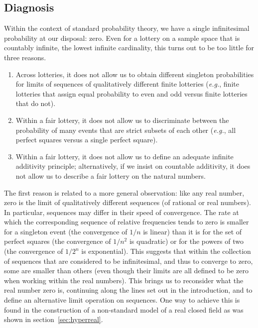 \subsection{Diagnosis}
Within the context of standard probability theory, we have a single infinitesimal probability at our disposal: zero. Even for a lottery on a sample space that is countably infinite, the lowest infinite cardinality, this turns out to be too little for three reasons.
\begin{enumerate}
  \item Across lotteries, it does not allow us to obtain different singleton probabilities for limits of sequences of qualitatively different finite lotteries (\textit{e.g.}, finite lotteries that assign equal probability to even and odd versus finite lotteries that do not).
  \item Within a fair lottery, it does not allow us to discriminate between the probability of many events that are strict subsets of each other (\textit{e.g.}, all perfect squares versus a single perfect square).
  \item Within a fair lottery, it does not allow us to define an adequate infinite additivity principle; alternatively, if we insist on countable additivity, it does not allow us to describe a fair lottery on the natural numbers.
\end{enumerate}

The first reason is related to a more general observation: like any real number, zero is the limit of qualitatively different sequences (of rational or real numbers). In particular, sequences may differ in their speed of convergence. The rate at which the corresponding sequence of relative frequencies tends to zero is smaller for a singleton event (the convergence of $1/n$ is linear) than it is for the set of perfect squares (the convergence of $1/n^2$ is quadratic) or for the powers of two (the convergence of  $1/2^n$ is exponential). This suggests that within the collection of sequences that are considered to be infinitesimal, and thus to converge to zero, some are smaller than others (even though their limits are all defined to be zero when working within the real numbers).
This brings us to reconsider what the real number zero is, continuing along the lines set out in the introduction, and to define an alternative limit operation on sequences. One way to achieve this is found in the construction of a non-standard model of a real closed field as was shown in section~\ref{sec:hyperreal}.

